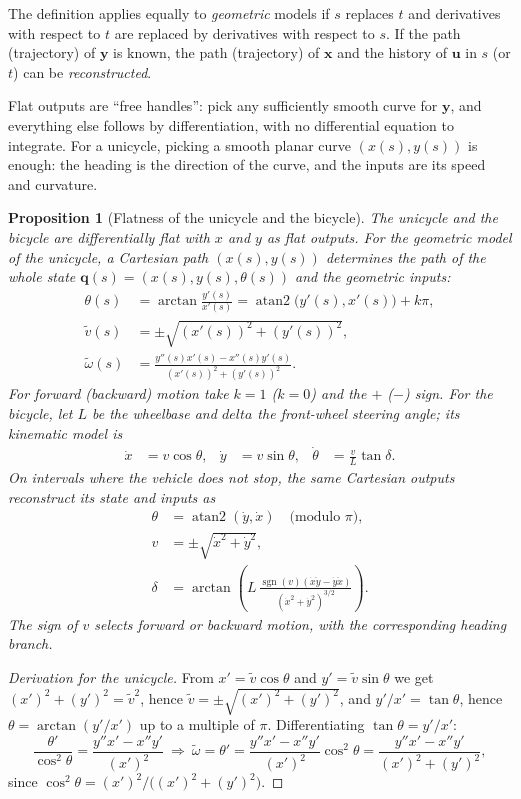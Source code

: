 \documentclass[11pt,a4paper]{article}
\newcommand{\q}{\boldsymbol{q}}
\newcommand{\vt}{\tilde v}
\newcommand{\wt}{\tilde\omega}
\newcommand{\atan}{\operatorname{atan2}}
\theoremstyle{definition}
\theoremstyle{plain}
\newtheorem{proposition}[definition]{Proposition}
\theoremstyle{remark}
\begin{document}
The definition applies equally to \emph{geometric} models if $s$ replaces $t$ and derivatives with respect to $t$ are
replaced by derivatives with respect to $s$. If the path (trajectory) of $\boldsymbol y$ is known, the path (trajectory) of
$\boldsymbol x$ and the history of $\boldsymbol u$ in $s$ (or $t$) can be \emph{reconstructed}.

\begin{intuition}
Flat outputs are ``free handles'': pick any sufficiently smooth curve for $\boldsymbol y$, and everything else follows by
differentiation, with no differential equation to integrate. For a unicycle, picking a smooth planar curve $(x(s),y(s))$ is
enough: the heading is the direction of the curve, and the inputs are its speed and curvature.
\end{intuition}

\begin{proposition}[Flatness of the unicycle and the bicycle]\label{prop:flatuni}
The unicycle and the bicycle are differentially flat with $x$ and $y$ as flat outputs. For the geometric model of the unicycle, a
Cartesian path $(x(s),y(s))$ determines the path of the whole state $\q(s)=(x(s),y(s),\theta(s))$ and the geometric inputs:
\begin{align}
\theta(s)&=\arctan\frac{y'(s)}{x'(s)}=\atan\big(y'(s),x'(s)\big)+k\pi,\\
\vt(s)&=\pm\sqrt{(x'(s))^2+(y'(s))^2},\\
\wt(s)&=\frac{y''(s)x'(s)-x''(s)y'(s)}{(x'(s))^2+(y'(s))^2}.
\end{align}
For forward (backward) motion take $k=1$ ($k=0$) and the $+$ ($-$) sign.
For the bicycle, let $L$ be the wheelbase and $delta$ the front-wheel steering angle; its kinematic model is
\begin{align*}
\dot x&=v\cos\theta, & \dot y&=v\sin\theta, &
\dot\theta&=\frac{v}{L}\tan\delta.
\end{align*}
On intervals where the vehicle does not stop, the same Cartesian outputs reconstruct its state and inputs as
\begin{align*}
\theta&=\operatorname{atan2}(\dot y,\dot x)\quad\text{(modulo $\pi$)},\\
v&=\pm\sqrt{\dot x^2+\dot y^2},\\
\delta&=\arctan\!\left(L\,\frac{\operatorname{sgn}(v)(\dot x\ddot y-\dot y\ddot x)}
                              {(\dot x^2+\dot y^2)^{3/2}}\right).
\end{align*}
The sign of $v$ selects forward or backward motion, with the corresponding heading branch.
\end{proposition}
\begin{proof}[Derivation for the unicycle]
From $x'=\vt\cos\theta$ and $y'=\vt\sin\theta$ we get $(x')^2+(y')^2=\vt^2$, hence $\vt=\pm\sqrt{(x')^2+(y')^2}$, and
$y'/x'=\tan\theta$, hence $\theta=\arctan(y'/x')$ up to a multiple of $\pi$. Differentiating $\tan\theta=y'/x'$:
\[
\frac{\theta'}{\cos^2\theta}=\frac{y''x'-x''y'}{(x')^2}\ \Longrightarrow\ 
\wt=\theta'=\frac{y''x'-x''y'}{(x')^2}\cos^2\theta=\frac{y''x'-x''y'}{(x')^2+(y')^2},
\]
since $\cos^2\theta=(x')^2/\big((x')^2+(y')^2\big)$. \qedhere
\end{proof}
\end{document}
